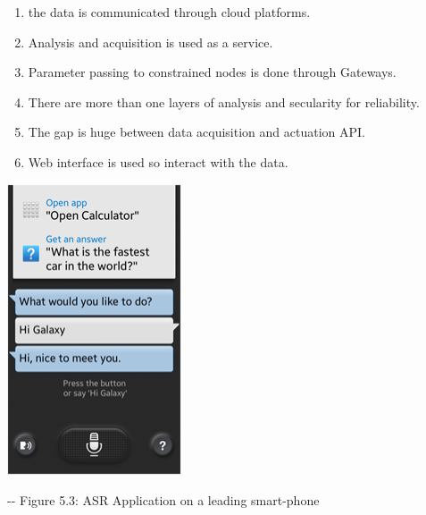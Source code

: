\documentclass[12pt]{article}
\makeatletter
\newenvironment{indentation}[3]%
	{\par\setlength{\parindent}{#3}
	\setlength{\leftmargin}{#1}       \setlength{\rightmargin}{#2}%
	\advance\linewidth -\leftmargin       \advance\linewidth -\rightmargin%
	\advance\@totalleftmargin\leftmargin  \@setpar{{\@@par}}%
	\parshape 1\@totalleftmargin \linewidth\ignorespaces}{\par}%
\makeatother
\begin{document}
\begin{enumerate}
	\item the data is communicated through cloud platforms.
	\item Analysis and acquisition is used as a service.
	\item Parameter passing to constrained nodes is done through Gateways.
	\item There are more than one layers of analysis and secularity for reliability.
	\item The gap is huge between data acquisition and actuation API.
	\item Web interface is used so interact with the data.
\end{enumerate}
\includegraphics[width=146pt]{img-9.png}
\begin{center}
\begin{indentation}{0pt}{0pt}{0pt}
Figure 5.3: ASR Application on a leading smart-phone
\end{indentation}
\end{center}
\end{document}
